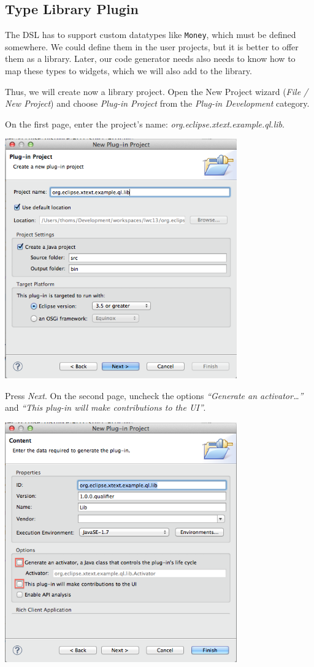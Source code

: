 
\subsection{Type Library Plugin}

The DSL has to support custom datatypes like \texttt{Money}, which must be
defined somewhere. We could define them in the user projects, but it is better
to offer them as a library. Later, our code generator needs also needs to know
how to map these types to widgets, which we will also add to the library.

Thus, we will create now a library project. Open the New Project wizard (\emph{File /
New Project}) and choose \emph{Plug-in Project} from the \emph{Plug-in Development} category.

On the first page, enter the project's name: \emph{org.eclipse.xtext.example.ql.lib}.

\includegraphics[width=10cm]{./images/chapter01/NewPluginProject_01.png}

Press \emph{Next}. On the second page, uncheck the options \emph{``Generate an
activator\ldots''} and \emph{``This plug-in will make contributions to the UI''}.

\includegraphics[width=10cm]{./images/chapter01/NewPluginProject_02.png}

